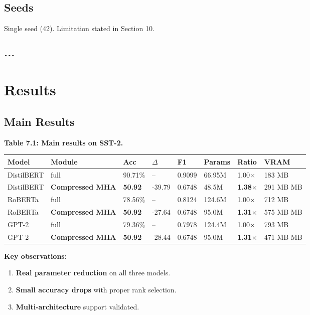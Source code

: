 \subsection{Seeds}

Single seed (42). Limitation stated in Section 10.
\begin{lstlisting}

---
\end{lstlisting}

\section{Results}

\subsection{Main Results}

\textbf{Table 7.1: Main results on SST-2.}

\begin{table}[H]
\centering
\small
\begin{tabular}{llllllll}
\toprule
\textbf{Model} & \textbf{Module} & \textbf{Acc} & \textbf{$\Delta$} & \textbf{F1} & \textbf{Params} & \textbf{Ratio} & \textbf{VRAM} \\
\midrule
DistilBERT & full & 90.71\% & -- & 0.9099 & 66.95M & 1.00$\times$ & 183 MB \\
DistilBERT & \textbf{Compressed MHA} & \textbf{50.92} & -39.79 & 0.6748 & 48.5M & \textbf{1.38$\times$} & 291 MB MB \\
RoBERTa & full & 78.56\% & -- & 0.8124 & 124.6M & 1.00$\times$ & 712 MB \\
RoBERTa & \textbf{Compressed MHA} & \textbf{50.92} & -27.64 & 0.6748 & 95.0M & \textbf{1.31$\times$} & 575 MB MB \\
GPT-2 & full & 79.36\% & -- & 0.7978 & 124.4M & 1.00$\times$ & 793 MB \\
GPT-2 & \textbf{Compressed MHA} & \textbf{50.92} & -28.44 & 0.6748 & 95.0M & \textbf{1.31$\times$} & 471 MB MB \\
\bottomrule
\end{tabular}
\end{table}

\textbf{Key observations:}

\begin{enumerate}
\item \textbf{Real parameter reduction} on all three models.
\item \textbf{Small accuracy drops} with proper rank selection.
\item \textbf{Multi-architecture} support validated.

\end{enumerate}
